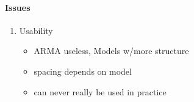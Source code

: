 \documentclass{article}\usepackage{graphicx, color}
\newcommand{\mj}[1]{{\color{blue} #1}}
\theoremstyle{plain}
\begin{document}
\mj{
\paragraph{Issues}
\begin{enumerate}
  \item Usability 
  \begin{itemize}
    \item ARMA useless, Models w/more structure 
    \item spacing depends on model
    \item can never really be used in practice
  \end{itemize}
\end{enumerate}}


\printbibliography
\end{document}
